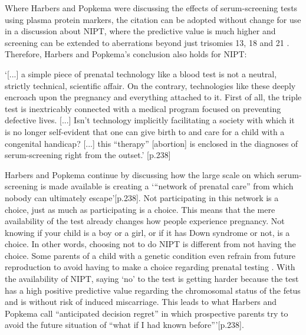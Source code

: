 \noindent Where Harbers and Popkema were discussing the effects of serum-screening tests using plasma protein markers, the citation can be adopted without change for use in a discussion about NIPT, where the predictive value is much higher and screening can be extended to aberrations beyond just trisomies 13, 18 and 21 \cite{Bianchi_2014,Amorim_Costa_2017}. 
Therefore, Harbers and Popkema’s conclusion also holds for NIPT: \newline 

\hfill\begin{minipage}{\dimexpr\textwidth-1cm}
	‘[...] a simple piece of prenatal technology like a blood test is not a neutral, strictly technical, scientific affair. On the contrary, technologies like these deeply encroach upon the pregnancy and everything attached to it. First of all, the triple test is inextricably connected with a medical program focused on preventing defective lives. [...] Isn’t technology implicitly facilitating a society with which it is no longer self-evident that one can give birth to and care for a child with a congenital handicap? [...] this “therapy” [abortion] is enclosed in the diagnoses of serum-screening right from the outset.’ \cite{Harbers_2005}[p.238]
\end{minipage} \newline \newline

\noindent Harbers and Popkema continue by discussing how the large scale on which serum-screening is made available is creating a ‘“network of prenatal care” from which nobody can ultimately escape’[p.238]. 
Not participating in this network is a choice, just as much as participating is a choice. 
This means that the mere availability of the test already changes how people experience pregnancy. 
Not knowing if your child is a boy or a girl, or if it has Down syndrome or not, is a choice. 
In other words, choosing not to do NIPT is different from not having the choice. Some parents of a child with a genetic condition even refrain from future reproduction to avoid having to make a choice regarding prenatal testing \cite{Kelly_2009}. 
With the availability of NIPT, saying ‘no’ to the test is getting harder because the test has a high positive predictive value regarding the chromosomal status of the fetus and is without risk of induced miscarriage. 
This leads to what Harbers and Popkema call “anticipated decision regret” in which prospective parents try to avoid the future situation of “what if I had known before”’\cite{Harbers_2005}[p.238]. 

